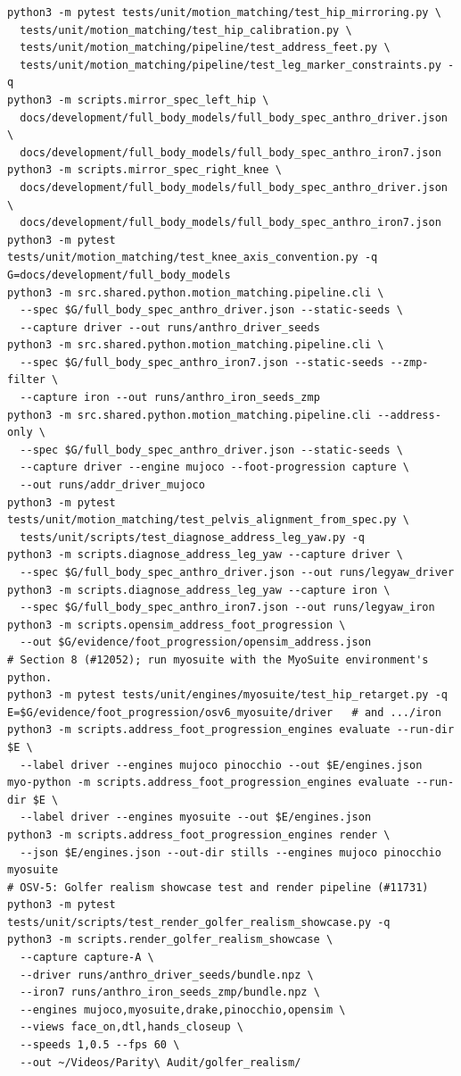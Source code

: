 \documentclass[11pt]{article}
\begin{document}
\begin{verbatim}
python3 -m pytest tests/unit/motion_matching/test_hip_mirroring.py \
  tests/unit/motion_matching/test_hip_calibration.py \
  tests/unit/motion_matching/pipeline/test_address_feet.py \
  tests/unit/motion_matching/pipeline/test_leg_marker_constraints.py -q
python3 -m scripts.mirror_spec_left_hip \
  docs/development/full_body_models/full_body_spec_anthro_driver.json \
  docs/development/full_body_models/full_body_spec_anthro_iron7.json
python3 -m scripts.mirror_spec_right_knee \
  docs/development/full_body_models/full_body_spec_anthro_driver.json \
  docs/development/full_body_models/full_body_spec_anthro_iron7.json
python3 -m pytest tests/unit/motion_matching/test_knee_axis_convention.py -q
G=docs/development/full_body_models
python3 -m src.shared.python.motion_matching.pipeline.cli \
  --spec $G/full_body_spec_anthro_driver.json --static-seeds \
  --capture driver --out runs/anthro_driver_seeds
python3 -m src.shared.python.motion_matching.pipeline.cli \
  --spec $G/full_body_spec_anthro_iron7.json --static-seeds --zmp-filter \
  --capture iron --out runs/anthro_iron_seeds_zmp
python3 -m src.shared.python.motion_matching.pipeline.cli --address-only \
  --spec $G/full_body_spec_anthro_driver.json --static-seeds \
  --capture driver --engine mujoco --foot-progression capture \
  --out runs/addr_driver_mujoco
python3 -m pytest tests/unit/motion_matching/test_pelvis_alignment_from_spec.py \
  tests/unit/scripts/test_diagnose_address_leg_yaw.py -q
python3 -m scripts.diagnose_address_leg_yaw --capture driver \
  --spec $G/full_body_spec_anthro_driver.json --out runs/legyaw_driver
python3 -m scripts.diagnose_address_leg_yaw --capture iron \
  --spec $G/full_body_spec_anthro_iron7.json --out runs/legyaw_iron
python3 -m scripts.opensim_address_foot_progression \
  --out $G/evidence/foot_progression/opensim_address.json
# Section 8 (#12052); run myosuite with the MyoSuite environment's python.
python3 -m pytest tests/unit/engines/myosuite/test_hip_retarget.py -q
E=$G/evidence/foot_progression/osv6_myosuite/driver   # and .../iron
python3 -m scripts.address_foot_progression_engines evaluate --run-dir $E \
  --label driver --engines mujoco pinocchio --out $E/engines.json
myo-python -m scripts.address_foot_progression_engines evaluate --run-dir $E \
  --label driver --engines myosuite --out $E/engines.json
python3 -m scripts.address_foot_progression_engines render \
  --json $E/engines.json --out-dir stills --engines mujoco pinocchio myosuite
# OSV-5: Golfer realism showcase test and render pipeline (#11731)
python3 -m pytest tests/unit/scripts/test_render_golfer_realism_showcase.py -q
python3 -m scripts.render_golfer_realism_showcase \
  --capture capture-A \
  --driver runs/anthro_driver_seeds/bundle.npz \
  --iron7 runs/anthro_iron_seeds_zmp/bundle.npz \
  --engines mujoco,myosuite,drake,pinocchio,opensim \
  --views face_on,dtl,hands_closeup \
  --speeds 1,0.5 --fps 60 \
  --out ~/Videos/Parity\ Audit/golfer_realism/
\end{verbatim}
\end{document}
